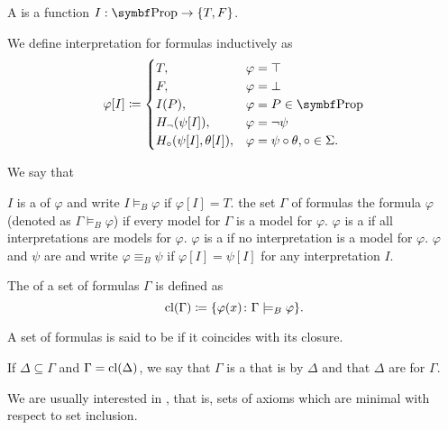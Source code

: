 \begin{definition}\label{def:propositional_interpretation}
  A  is a function \( I: \Cat{Prop} \to \{ T, F \} \).

  We define interpretation for formulas inductively as
  \begin{align*}
    \varphi[I] \coloneqq \begin{cases}
      T,                           &\varphi = \top \\
      F,                           &\varphi = \bot \\
      I(P),                        &\varphi = P \in \Cat{Prop} \\
      H_\neg(\psi[I]),             &\varphi = \neg \psi         \\
      H_\circ(\psi[I], \theta[I]), &\varphi = \psi \circ \theta, \circ \in \Sigma.
    \end{cases}
  \end{align*}

  We say that
  \begin{defenum}
     \( I \) is a  of \( \varphi \) and write \( I \models_B \varphi \) if \( \varphi[I] = T \).
     the set \( \Gamma \) of formulas  the formula \( \varphi \) (denoted as \( \Gamma \models_B \varphi \)) if every model for \( \Gamma \) is a model for \( \varphi \).
     \( \varphi \) is a  if all interpretations are models for \( \varphi \).
     \( \varphi \) is a  if no interpretation is a model for \( \varphi \).
     \( \varphi \) and \( \psi \) are  and write \( \varphi \equiv_B \psi \) if \( \varphi[I] = \psi[I] \) for any interpretation \( I \).
  \end{defenum}
\end{definition}

\begin{definition}\label{def:propositional_theory}\cite[definition 15.1]{OpenLogic20201202}
  The  of a set of formulas \( \Gamma \) is defined as
  \begin{equation*}
    \operatorname{cl}(\Gamma) \coloneqq \{ \varphi(x) \colon \Gamma \models_B \varphi \}.
  \end{equation*}

  A set of formulas is said to be  if it coincides with its closure.

  If \( \Delta \subseteq \Gamma \) and \( \Gamma = \operatorname{cl}(\Delta) \), we say that \( \Gamma \) is a  that is  by \( \Delta \) and that \( \Delta \) are  for \( \Gamma \).

  We are usually interested in , that is, sets of axioms which are minimal with respect to set inclusion.
\end{definition}

